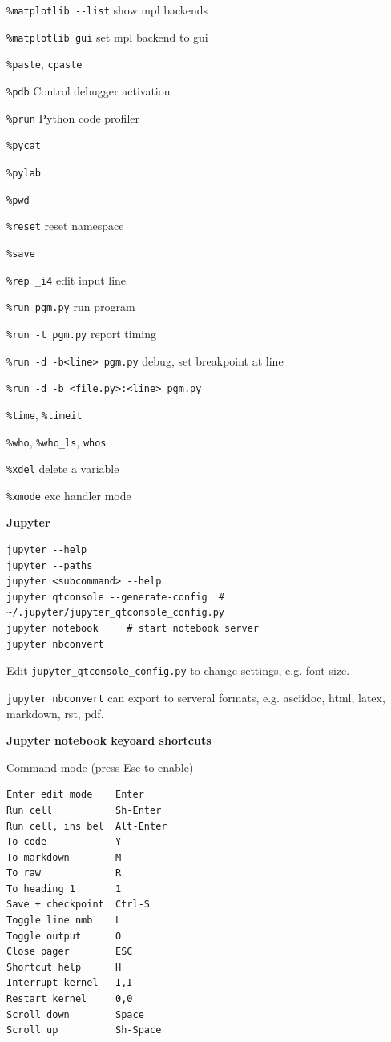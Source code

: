 \documentclass[9pt,a4wide]{extarticle}
\begin{document}
\begin{multicols}{3}
{\tt \%matplotlib -{}-list} show mpl backends

{\tt \%matplotlib gui} set mpl backend to gui

{\tt \%paste}, {\tt cpaste}

{\tt \%pdb} Control debugger activation

{\tt \%prun} Python code profiler

{\tt \%pycat}

{\tt \%pylab}

{\tt \%pwd}

{\tt \%reset} \rval reset namespace

{\tt \%save}

{\tt \%rep \_i4} \rval edit input line

{\tt \%run pgm.py} \rval run program

{\tt \%run -t pgm.py} \rval report timing

{\tt \%run -d -b<line> pgm.py} \rval debug, set breakpoint at line

{\tt \%run -d -b <file.py>:<line> pgm.py}

{\tt \%time}, {\tt \%timeit}

{\tt \%who}, {\tt \%who\_ls}, {\tt whos}

{\tt \%xdel} delete a variable

{\tt \%xmode} exc handler mode

\end{multicols}

\medskip




\medskip
{\bf Jupyter}
{}

\begin{verbatim}
jupyter --help
jupyter --paths
jupyter <subcommand> --help
jupyter qtconsole --generate-config  # ~/.jupyter/jupyter_qtconsole_config.py
jupyter notebook     # start notebook server
jupyter nbconvert    
\end{verbatim}

Edit {\tt jupyter\_qtconsole\_config.py} to change settings, e.g. font size.

{\tt jupyter nbconvert} can export to serveral formats, e.g. asciidoc, html,
latex, markdown, rst, pdf.

\medskip

{\bf Jupyter notebook keyoard shortcuts}

Command mode (press Esc to enable)

\begin{verbatim}      
Enter edit mode    Enter
Run cell           Sh-Enter
Run cell, ins bel  Alt-Enter
To code            Y
To markdown        M
To raw             R
To heading 1       1
Save + checkpoint  Ctrl-S
Toggle line nmb    L
Toggle output      O
Close pager        ESC
Shortcut help      H
Interrupt kernel   I,I
Restart kernel     0,0
Scroll down        Space
Scroll up          Sh-Space
\end{verbatim}      
\end{document}
